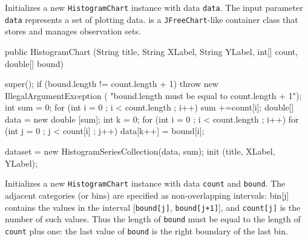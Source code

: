 \begin{tabb}
   Initializes a new \texttt{HistogramChart} instance with data \texttt{data}.
   The input parameter \texttt{data} represents a set of plotting data.
    is a
   \texttt{JFreeChart}-like container class that stores and manages
    observation sets.
\end{tabb}
\begin{htmlonly}
\end{htmlonly}
\begin{code}

    public HistogramChart (String title, String XLabel, String YLabel,
                           int[] count, double[] bound) \begin{hide} {
      super();
      if (bound.length != count.length + 1)
         throw new IllegalArgumentException (
            "bound.length must be equal to count.length + 1");
      int sum = 0;
      for (int i = 0 ; i < count.length ; i++) sum +=count[i];
      double[] data = new double [sum];
      int k = 0;
      for (int i = 0 ; i < count.length ; i++)
         for (int j = 0 ; j < count[i] ; j++)
            data[k++] = bound[i];

      dataset = new HistogramSeriesCollection(data, sum);
      init (title, XLabel, YLabel);
   }\end{hide}
\end{code}
\begin{tabb}
   Initializes a new \texttt{HistogramChart} instance with data \texttt{count}
   and \texttt{bound}. The adjacent categories (or bins) are specified as
   non-overlapping intervals: bin[j] contains the values in the interval
   [\texttt{bound[j]}, \texttt{bound[j+1]}], and \texttt{count[j]} is the
   number of such values. %
   Thus the length of \texttt{bound} must be equal to
   the length of \texttt{count} plus one: the last value of \texttt{bound}
   is the right boundary of the last bin.
\end{tabb}
\begin{htmlonly}
\end{htmlonly}

